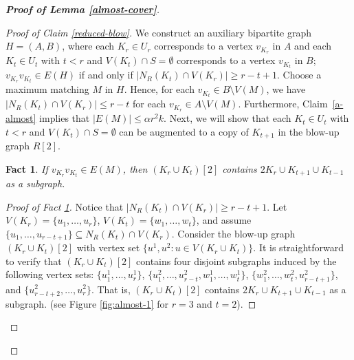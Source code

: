 \documentclass[11pt, a4paper]{article}
\newtheorem{fact}[theorem]{Fact}
\theoremstyle{definition}
\newcommand{\<}{\subseteq}
\begin{document}
\begin{proof}[\bf Proof of Lemma \ref{almost-cover}]
\begin{proof}[Proof of Claim \ref{reduced-blow}]
We construct an auxiliary bipartite graph $H=(A,B)$, where each $K_r\in U_r$ corresponds to a vertex $v_{K_r}$ in $A$ and each $K_t\in U_t$ with $t<r$ and $V(K_t)\cap S=\emptyset$ corresponds to a vertex $v_{K_t}$ in $B$; $v_{K_r}v_{K_t}\in E(H)$ if and only if $|N_R(K_t)\cap V(K_r)|\geq r-t+1$. Choose a maximum matching $M$ in $H$. Hence, for each $v_{K_t}\in B\setminus V(M)$, we have $|N_R(K_t)\cap V(K_r)|\leq r-t$ for each $v_{K_r}\in A\setminus V(M)$. Furthermore, Claim~\ref{a-almost} implies that $|E(M)|\leq \alpha r^2 k$. Next, we will show that each $K_t\in U_t$ with $t<r$  and $V(K_t)\cap S=\emptyset$ can be augmented to a copy of $K_{t+1}$ in the blow-up graph $R[2]$.  

\begin{fact}\label{claim-b1}
    If $v_{K_r}v_{K_t}\in E(M)$, then $(K_r\cup K_t)[2]$ contains $2K_r\cup K_{t+1}\cup K_{t-1}$ as a subgraph. 
\end{fact}
\begin{proof}[Proof of Fact  \ref{claim-b1}]
  Notice that $|N_R(K_t)\cap V(K_r)|\geq r-t+1$.  Let $V(K_r)=\{u_1,\ldots,u_r\}$, $V(K_t)=\{w_1,\ldots,w_t\}$,  and assume $\{u_1,\ldots,u_{r-t+1}\}\subseteq N_R(K_t)\cap V(K_r)$. Consider the blow-up graph $(K_r \cup K_t)[2]$ with vertex set $\{u^1,u^2:u\in V(K_r\cup K_t)\}$. It is straightforward to verify that $(K_r \cup K_t)[2]$ contains four disjoint subgraphs induced by the following vertex sets: $\{u_1^1,\ldots,u_r^1\}$, $\{u_1^2,\ldots,u_{r-t}^2,w_1^1,\ldots,w_t^1\}$, $\{w_1^2,\ldots,w_t^2,u_{r-t+1}^2\}$, and $\{u_{r-t+2}^2,\ldots, u_r^2\}$. That is, $(K_r\cup K_t)[2]$ contains $2K_r\cup K_{t+1}\cup K_{t-1}$ as a subgraph. (see Figure \ref{fig:almost-1} for $r=3$ and $t=2$). 
\end{proof}



\end{proof}
\end{proof}
\end{document}
